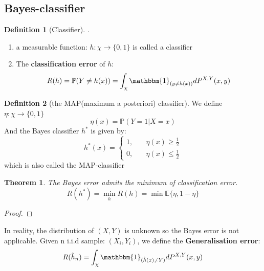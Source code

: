 \documentclass[a4paper,12pt, oneside, fleqn]{book}
\newtheorem{theorem}{Theorem}[section]
\theoremstyle{definition}
\newtheorem{definition}{Definition}[section]
\theoremstyle{remark}
\begin{document}
\subsection{Bayes-classifier}

\begin{definition}[Classifier].
\begin{enumerate}
	\item a measurable function: $h:\chi \rightarrow \{0, 1 \}$ is called a classifier
	\item The \textbf{classification error} of $h$:
		\begin{equation*}
			R(h) = \mathbb{P}(Y \neq h(x)) = \int_\chi \mathbbm{1}_{(y \neq h(x))} dP^{X, Y}(x, y)
		\end{equation*}
\end{enumerate}
\end{definition}

\begin{definition}[the MAP(maximum a posteriori) classifier]
We define $\eta: \chi \rightarrow \{0, 1\}$
\begin{equation*}
	\eta(x) = \mathbb{P} (Y = 1| X = x)
\end{equation*}
And the Bayes classifier $h^*$ is given by:
\begin{equation*}
	h^*(x) = 
		 \left\{\begin{aligned}
		 		1, \quad & \eta(x) \geq \frac{1}{2}\\
		 		0, \quad & \eta(x) \leq \frac{1}{2}
		 		\end{aligned}\right.
\end{equation*}
which is also called the MAP-classifier
\end{definition}

\begin{theorem} \label{technique: conditioning}
The Bayes error admits the minimum of classification error.
\begin{equation*}
	R(h^*) = \min_h R(h) = \min \mathbb{E} \{ \eta, 1 - \eta \}	
\end{equation*}
\end{theorem}

\begin{proof}
	
\end{proof}


In reality, the distribution of $(X,Y)$ is unknown so the Bayes error is not applicable. Given n i.i.d sample: $(X_i, Y_i)$, we define the \textbf{Generalisation error}:
\begin{equation*}
	R(\hat{h}_n) = \int_\chi \mathbbm{1}_{(\hat{h}(x) \neq Y)} dP^{X, Y}(x, y)
\end{equation*}
\end{document}
